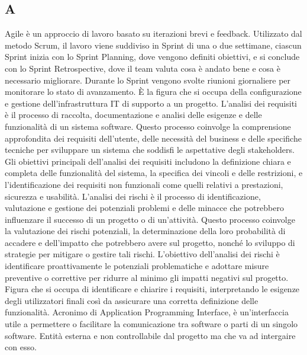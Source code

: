 \begin{center}
\section*{A}
\end{center}
Agile è un approccio di lavoro basato su iterazioni brevi e feedback. Utilizzato dal metodo Scrum, il lavoro viene suddiviso in Sprint di una o due settimane, ciascun Sprint inizia con lo Sprint Planning, dove vengono definiti obiettivi, e si conclude con lo Sprint Retrospective, dove il team valuta cosa è andato bene e cosa è necessario migliorare. Durante lo Sprint vengono svolte riunioni giornaliere per monitorare lo stato di avanzamento.
È la figura che si occupa della configurazione e gestione dell'infrastruttura IT di supporto a un progetto.
L'analisi dei requisiti è il processo di raccolta, documentazione e analisi delle esigenze e delle funzionalità di un sistema software. Questo processo coinvolge la comprensione approfondita dei requisiti dell'utente, delle necessità del business e delle specifiche tecniche per sviluppare un sistema che soddisfi le aspettative degli stakeholders. Gli obiettivi principali dell'analisi dei requisiti includono la definizione chiara e completa delle funzionalità del sistema, la specifica dei vincoli e delle restrizioni, e l'identificazione dei requisiti non funzionali come quelli relativi a prestazioni, sicurezza e usabilità.
L'analisi dei rischi è il processo di identificazione, valutazione e gestione dei potenziali problemi e delle minacce che potrebbero influenzare il successo di un progetto o di un'attività. Questo processo coinvolge la valutazione dei rischi potenziali, la determinazione della loro probabilità di accadere e dell'impatto che potrebbero avere sul progetto, nonché lo sviluppo di strategie per mitigare o gestire tali rischi. L'obiettivo dell'analisi dei rischi è identificare proattivamente le potenziali problematiche e adottare misure preventive o correttive per ridurre al minimo gli impatti negativi sul progetto.
Figura che si occupa di identificare e chiarire i requisiti, interpretando le esigenze degli utilizzatori finali così da assicurare una corretta definizione delle funzionalità.
Acronimo di Application Programming Interface, è un'interfaccia utile a permettere o facilitare la comunicazione tra software o parti di un singolo software.
Entità esterna e non controllabile dal progetto ma che va ad intergaire con esso.
